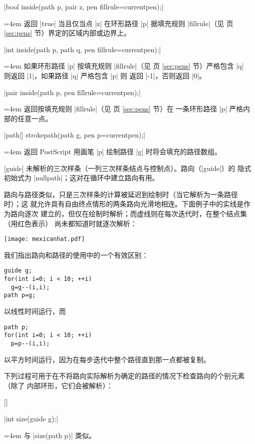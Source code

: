 \documentclass[nofonts,CJKnormalspaces]{ctexbook}[2009/05/20]
\makeatletter
\newenvironment{funclist}{\trivlist
  \parindent=0pt
\item[]
  \def\item{\medskip\par\leftskip=0pt}
  \def\go{\par\leftskip=4em}}
{\endtrivlist}
\newenvironment{typelist}{\itemize
  \let\old@item\@item
  \def\@item[##1]{\expandafter\old@item[\ttfamily\color{type!50!black}##1]}}
{\enditemize}
\newcommand*\prgname[1]{\textsf{#1}}
\makeatother
\begin{document}
\begin{typelist}
\begin{funclist}
\item |bool inside(path p, pair z, pen fillrule=currentpen);| \go
  返回 |true| 当且仅当点 |z| 在环形路径 |p| 据填充规则 |fillrule|（见
  \pageref{sec:pens} 页 \ref{sec:pens} 节）界定的区域内部或边界上。

\item |int inside(path p, path q, pen fillrule=currentpen);| \go
  如果环形路径 |p| 按填充规则 |fillrule|（见 \pageref{sec:pens} 页
  \ref{sec:pens} 节）严格包含 |q| 则返回 |1|，如果路径 |q| 严格包含 |p| 则
  返回 |-1|，否则返回 |0|。

\item |pair inside(path p, pen fillrule=currentpen);| \go
  返回按填充规则 |fillrule|（见 \pageref{sec:pens} 页 \ref{sec:pens} 节）在
  一条环形路径 |p| 严格内部的任意一点。

\item |path[] strokepath(path g, pen p=currentpen);| \go
  返回 \prgname{PostScript} 用画笔 |p| 绘制路径 |g| 时将会填充的路径数组。
\end{funclist}

\item[guide] 未解析的三次样条（一列三次样条结点与控制点）。路向（|guide|）的
隐式初始式为 |nullpath|；这对在循环中建立路向有用。

路向与路径类似，只是三次样条的计算被延迟到绘制时（当它解析为一条路径时）；这
就允许具有自由终点情形的两条路向光滑地相连。下面例子中的实线是作为路向逐次
建立的，但仅在绘制时解析；而虚线则在每次迭代时，在整个结点集（用红色表示）
尚未都知道时就逐次解析：

\begin{center}
  \texttt{[image: mexicanhat.pdf]}
\end{center}

我们指出路向和路径的使用中的一个有效区别：
\begin{lstlisting}
guide g;
for(int i=0; i < 10; ++i)
  g=g--(i,i);
path p=g;
\end{lstlisting}
以线性时间运行，而
\begin{lstlisting}
path p;
for(int i=0; i < 10; ++i)
  p=p--(i,i);
\end{lstlisting}
以平方时间运行，因为在每步迭代中整个路径直到那一点都被复制。

下列过程可用于在不将路向实际解析为确定的路径的情况下检查路向的个别元素（除了
内部环形，它们会被解析）：
\begin{funclist}
\item |int size(guide g);| \go
  与 |size(path p)| 类似。


\end{funclist}
\end{typelist}
\end{document}
